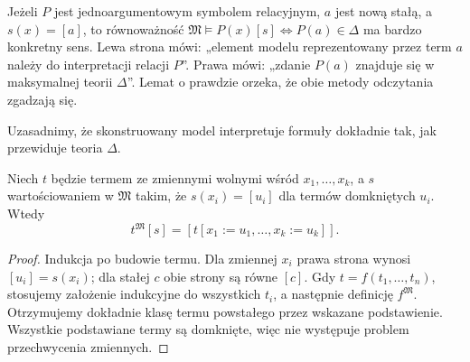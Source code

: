 \begin{przyklad}
Jeżeli $P$ jest jednoargumentowym symbolem relacyjnym,
$a$ jest nową stałą, a $s(x)=[a]$, to równoważność
$\mathfrak M\models P(x)[s]\iff P(a)\in\Delta$
ma bardzo konkretny sens. Lewa strona mówi:
„element modelu reprezentowany przez term $a$ należy do
interpretacji relacji $P$”. Prawa mówi: „zdanie $P(a)$
znajduje się w maksymalnej teorii $\Delta$”.
Lemat o prawdzie orzeka, że obie metody odczytania zgadzają się.
\end{przyklad}
Uzasadnimy, że skonstruowany model interpretuje formuły dokładnie tak, jak przewiduje teoria $\Delta$.

\begin{lemat}\label{lem:henkin-term-values}
Niech $t$ będzie termem ze zmiennymi wolnymi wśród $x_1,\ldots,x_k$, a $s$ wartościowaniem w $\mathfrak M$ takim, że $s(x_i)=[u_i]$ dla termów domkniętych $u_i$. Wtedy
\[
t^{\mathfrak M}[s]=[t[x_1:=u_1,\ldots,x_k:=u_k]].
\]
\end{lemat}
\begin{proof}
Indukcja po budowie termu. Dla zmiennej $x_i$ prawa strona wynosi $[u_i]=s(x_i)$; dla stałej $c$ obie strony są równe $[c]$. Gdy $t=f(t_1,\ldots,t_n)$, stosujemy założenie indukcyjne do wszystkich $t_i$, a następnie definicję $f^{\mathfrak M}$. Otrzymujemy dokładnie klasę termu powstałego przez wskazane podstawienie. Wszystkie podstawiane termy są domknięte, więc nie występuje problem przechwycenia zmiennych.
\end{proof}

